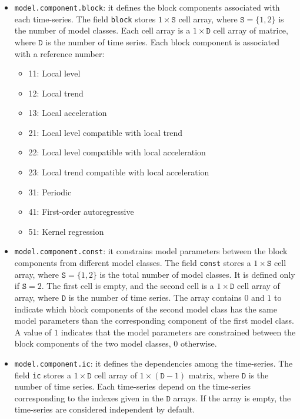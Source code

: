\begin{itemize}

\item \lstinline[basicstyle = \mlttfamily \small ]!model.component.block!: it defines the block components associated with each time-series.
The field \lstinline[basicstyle = \mlttfamily \small ]!block! stores $1\times \mathtt{S}$ cell array, where $\mathtt{S} = \{1,2 \}$ is the number of model classes.
Each cell array is a $1\times \mathtt{D}$ cell array of matrice, where $\mathtt{D}$ is the number of time series.
Each block component is associated with a reference number:
\begin{itemize}
\item 11: Local level 
\item 12: Local trend
\item 13: Local acceleration
\item 21: Local level compatible with local trend
\item 22: Local level compatible with local acceleration
\item 23: Local trend compatible with local acceleration
\item 31: Periodic
\item 41: First-order autoregressive
\item 51: Kernel regression
\end{itemize}

\item  \lstinline[basicstyle = \mlttfamily \small ]!model.component.const!: it constrains model parameters between the block components from different model classes.
The field \lstinline[basicstyle = \mlttfamily \small ]!const! stores a $1\times \mathtt{S}$ cell array, where $\mathtt{S} = \{1, 2 \}$ is the total number of model classes.
It is defined only if $\mathtt{S} = 2$.
The first cell is empty, and the second cell is a $1\times \mathtt{D}$ cell array of array, where $\mathtt{D}$ is the number of time series.
The array contains $0$ and $1$ to indicate which block components of the second model class has the same model parameters than the corresponding component of the first model class. 
A value of $1$ indicates that the model parameters are constrained between the block components of the two model classes, $0$ otherwise.

\item  \lstinline[basicstyle = \mlttfamily \small ]!model.component.ic!:  it defines the dependencies among the time-series.
The field \lstinline[basicstyle = \mlttfamily \small ]!ic! stores a $1\times \mathtt{D}$ cell array of $1\times (\mathtt{D}-1)$ matrix, where $\mathtt{D}$ is the number of time series.
Each time-series depend on the time-series corresponding to the indexes given in the $\mathtt{D}$ arrays.
If the array is empty, the time-series are considered independent by default.

\end{itemize}


